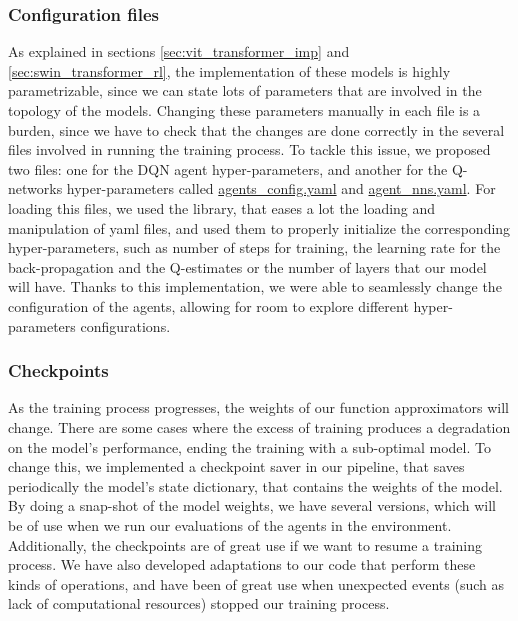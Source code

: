 \subsubsection{Configuration files}
\label{sec:conf_files}
As explained in sections \ref{sec:vit_transformer_imp} and \ref{sec:swin_transformer_rl}, the implementation of these models is highly parametrizable, since we can state lots of parameters that are involved in the topology of the models. Changing these parameters manually in each file is a burden, since we have to check that the changes are done correctly in the several files involved in running the training process. To tackle this issue, we proposed two files: one for the DQN agent hyper-parameters, and another for the Q-networks hyper-parameters called \href{https://github.com/Javimh18/DL_TFM/blob/main/config/agents_config.yaml}{agents\_config.yaml} and \href{https://github.com/Javimh18/DL_TFM/blob/main/config/agent_nns.yaml}{agent\_nns.yaml}.
For loading this files, we used the  library, that eases a lot the loading and manipulation of yaml files, and used them to properly initialize the corresponding hyper-parameters, such as number of steps for training, the learning rate for the back-propagation and the Q-estimates or the number of layers that our model will have. Thanks to this implementation, we were able to seamlessly change the configuration of the agents, allowing for room to explore different hyper-parameters configurations.

\subsubsection{Checkpoints}
As the training process progresses, the weights of our function approximators will change. There are some cases where the excess of training produces a degradation on the model's performance, ending the training with a sub-optimal model. To change this, we implemented a checkpoint saver in our pipeline, that saves periodically the model's state dictionary, that contains the weights of the model. By doing a snap-shot of the model weights, we have several versions, which will be of use when we run our evaluations of the agents in the environment. Additionally, the checkpoints are of great use if we want to resume a training process. We have also developed adaptations to our code that perform these kinds of operations, and have been of great use when unexpected events (such as lack of computational resources) stopped our training process.

